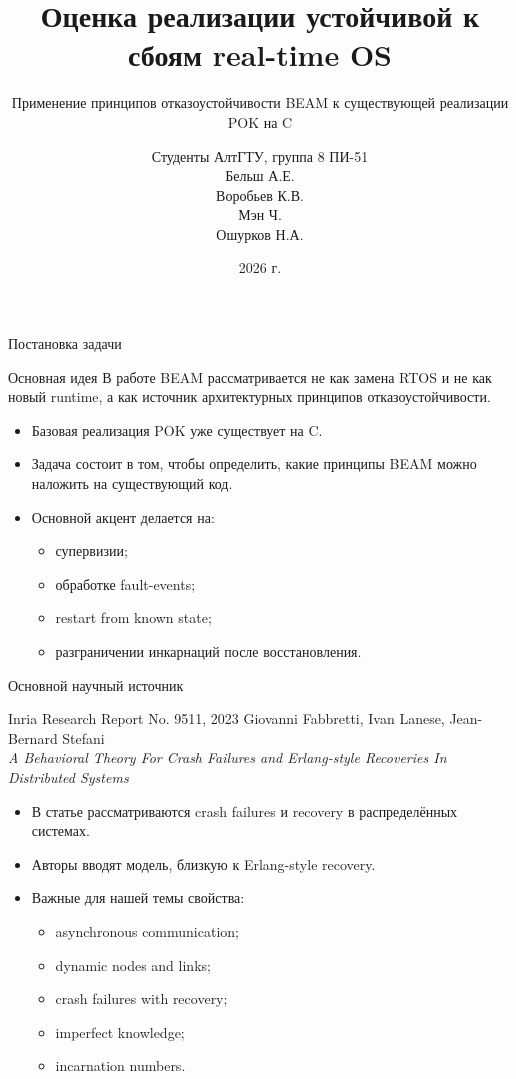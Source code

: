 \documentclass[aspectratio=169]{beamer}
\title{Оценка реализации устойчивой к сбоям real-time OS}
\subtitle{Применение принципов отказоустойчивости BEAM к существующей реализации POK на C}
\author{
	Студенты АлтГТУ, группа 8 ПИ-51\\
	Бельш А.Е.\\
	Воробьев К.В.\\
	Мэн Ч.\\
	Ошурков Н.А.
}
\date{2026 г.}
\begin{document}
	
	\begin{frame}{Постановка задачи}
		\begin{block}{Основная идея}
			В работе BEAM рассматривается не как замена RTOS и не как новый runtime, а как источник архитектурных принципов отказоустойчивости.
		\end{block}
		
		\vspace{0.3cm}
		
		\begin{itemize}
			\item Базовая реализация POK уже существует на C.
			\item Задача состоит в том, чтобы определить, какие принципы BEAM можно наложить на существующий код.
			\item Основной акцент делается на:
			\begin{itemize}
				\item супервизии;
				\item обработке fault-events;
				\item restart from known state;
				\item разграничении инкарнаций после восстановления.
			\end{itemize}
		\end{itemize}
	\end{frame}
	
	\begin{frame}{Основной научный источник}
		\begin{block}{Inria Research Report No. 9511, 2023}
			Giovanni Fabbretti, Ivan Lanese, Jean-Bernard Stefani\\
			\textit{A Behavioral Theory For Crash Failures and Erlang-style Recoveries In Distributed Systems}	
		\end{block}
		
		\begin{itemize}
			\item В статье рассматриваются crash failures и recovery в распределённых системах.
			\item Авторы вводят модель, близкую к Erlang-style recovery.
			\item Важные для нашей темы свойства:
			\begin{itemize}
				\item asynchronous communication;
				\item dynamic nodes and links;
				\item crash failures with recovery;
				\item imperfect knowledge;
				\item incarnation numbers.
			\end{itemize}
		\end{itemize}
	\end{frame}
	
\end{document}
